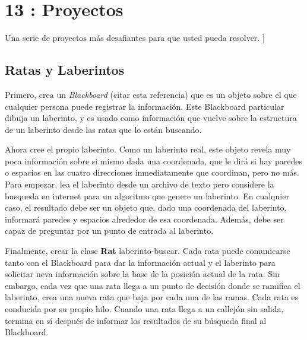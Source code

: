 \section*{13 : Proyectos}
\label{sec:proy}


Una serie de proyectos más desafiantes para que usted pueda resolver. \newline
[[Algunos de estos pueden convertirse en ejemplos en el libro, por lo que en algún momento podría desaparecer de aquí]]


\subsection*{Ratas y Laberintos}
\label{subsec:ratas}

Primero, crea un \textit{Blackboard }\newline(citar esta referencia) que es un objeto sobre el que cualquier persona puede registrar la información. Este Blackboard particular  dibuja un laberinto, y es usado como información que vuelve sobre la estructura de un laberinto desde  las ratas que lo están  buscando. \newline

Ahora cree el propio laberinto. Como un laberinto real, este objeto revela muy poca información sobre si mismo \-dada una coordenada, que le dirá si hay paredes o espacios en las cuatro direcciones  inmediatamente que coordinan, pero no más.  Para empezar, lea el laberinto desde un archivo de texto pero considere la busqueda en internet para un algoritmo que genere un laberinto. En cualquier caso, el resultado debe ser un objeto que, dado una coordenada del laberinto, informará paredes y espacios alrededor de esa coordenada. Además, debe ser capaz de preguntar por un punto de entrada al laberinto.  \newline

Finalmente, crear la clase \textbf{Rat} laberinto-buscar. Cada rata puede comunicarse tanto con el Blackboard para dar la información actual y el laberinto para solicitar neva información sobre la base de la posición actual de la rata. Sin embargo, cada vez que una rata llega a un punto de decisión donde se ramifica el laberinto, crea una nueva rata que baja por cada una de las ramas. Cada rata es conducida por su propio hilo.   Cuando una rata llega a un callejón sin salida, termina en sí después de informar los resultados de su búsqueda final al Blackboard.\newline

